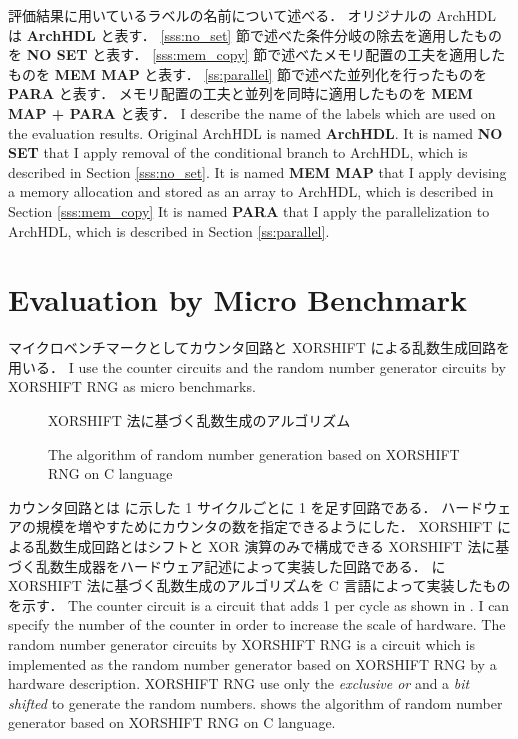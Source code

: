 評価結果に用いているラベルの名前について述べる．
オリジナルの ArchHDL は \textbf{ArchHDL} と表す．
\ref{sss:no_set} 節で述べた条件分岐の除去を適用したものを \textbf{NO SET} と表す．
\ref{sss:mem_copy} 節で述べたメモリ配置の工夫を適用したものを \textbf{MEM MAP} と表す．
\ref{ss:parallel} 節で述べた並列化を行ったものを \textbf{PARA} と表す．
メモリ配置の工夫と並列を同時に適用したものを \textbf{MEM MAP + PARA} と表す．
\fi
I describe the name of the labels which are used on the evaluation results.
Original ArchHDL is named \textbf{ArchHDL}.
It is named \textbf{NO SET} that I apply removal of the conditional branch to ArchHDL, which is described in Section \ref{sss:no_set}.
It is named \textbf{MEM MAP} that I apply devising a memory allocation and stored as an array to ArchHDL, which is described in Section \ref{sss:mem_copy}
It is named \textbf{PARA} that I apply the parallelization to ArchHDL, which is described in Section \ref{ss:parallel}.


\section{Evaluation by Micro Benchmark}

マイクロベンチマークとしてカウンタ回路と XORSHIFT による乱数生成回路を用いる．
\fi
I use the counter circuits and the random number generator circuits by XORSHIFT RNG as micro benchmarks.

\begin{figure}[tb]
 
 \caption{XORSHIFT 法に基づく乱数生成のアルゴリズム}
\fi
 \caption{The algorithm of random number generation based on XORSHIFT RNG on C language}
 \label{src:xorshift_alg}
\end{figure}

カウンタ回路とは  に示した 1 サイクルごとに 1 を足す回路である．
ハードウェアの規模を増やすためにカウンタの数を指定できるようにした．
XORSHIFT による乱数生成回路とはシフトと XOR 演算のみで構成できる XORSHIFT 法に基づく乱数生成器をハードウェア記述によって実装した回路である．
 に XORSHIFT 法に基づく乱数生成のアルゴリズムを C 言語によって実装したものを示す．
\fi
The counter circuit is a circuit that adds 1 per cycle as shown in .
I can specify the number of the counter in order to increase the scale of hardware.
The random number generator circuits by XORSHIFT RNG is a circuit which is implemented as the random number generator based on XORSHIFT RNG by a hardware description.
XORSHIFT RNG use only the \textit{exclusive or} and a \textit{bit shifted} to generate the random numbers.
 shows the algorithm of random number generator based on XORSHIFT RNG on C language.

